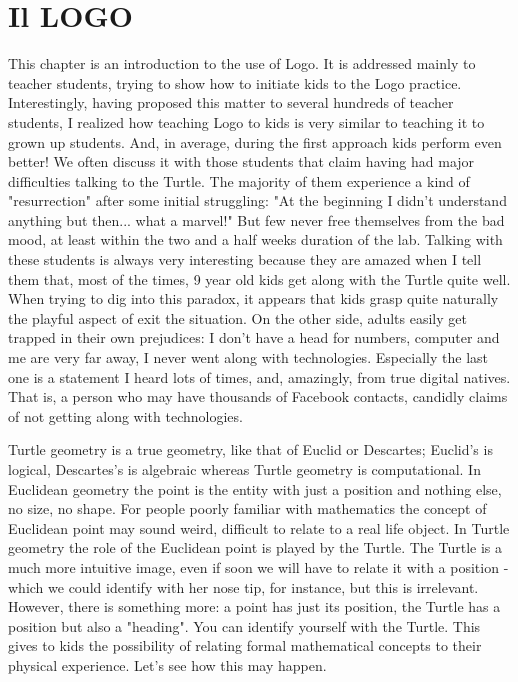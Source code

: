 \chapter{Il LOGO} \label{cap:papert2}

This chapter is an introduction to the use of Logo. It is addressed mainly to teacher students, trying to show how to initiate kids to the Logo practice. Interestingly, having proposed this matter to several hundreds of teacher students,  I realized how teaching Logo to kids is very similar to teaching it to grown up students. And, in average, during the first approach kids perform even better! We often discuss it with those students that claim having had major difficulties talking to the Turtle. The majority of them experience a kind of "resurrection" after some initial struggling: "At the beginning I didn't understand anything but then... what a marvel!"  But few never free themselves from the bad mood, at least within the two and a half weeks duration of the lab. Talking with these students is always very interesting because they are amazed when I tell them that, most of the times, 9 year old kids get along with the Turtle quite well. When trying to dig into this paradox, it appears that kids grasp quite naturally the playful aspect of exit
the situation. On the other side, adults easily get trapped in their own prejudices: I don't have a head for numbers, computer and me are very far away, I never went along with technologies. Especially the last one is a statement I heard lots of times, and, amazingly, from true digital natives. That is, a person who may have thousands of Facebook contacts, candidly claims of not getting along with technologies.

Turtle geometry is a true geometry, like that of Euclid or Descartes; Euclid's is logical, Descartes's is algebraic whereas Turtle geometry is computational. In Euclidean geometry the point is the entity with just a position and  nothing else, no size, no shape. For people poorly familiar with mathematics the concept of Euclidean point may sound weird, difficult to relate to a real life object. In Turtle geometry the role of the Euclidean point is played by the Turtle. The Turtle is a much more intuitive image, even if soon we will have to relate it with a position - which we could identify with her nose tip, for instance, but this is irrelevant. However, there is something more: a point has just its position, the Turtle has a position but also a "heading". You can identify yourself with the Turtle. This gives to kids the possibility of relating formal mathematical concepts to their physical experience. Let's see how this may happen.

